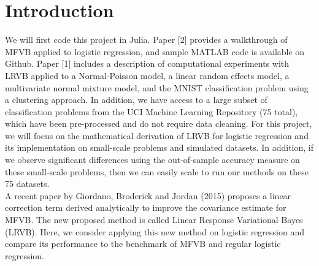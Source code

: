 
\section{Introduction}\label{sec:intro}
We will first code this project in Julia. Paper [2] provides a walkthrough of MFVB applied to logistic regression, and sample MATLAB code is available on Github.  Paper [1] includes a description of computational experiments with LRVB applied to a Normal-Poisson model, a linear random effects model, a multivariate normal mixture model, and the MNIST classification problem using a clustering approach.  In addition, we have access to a large subset of classification problems from the UCI Machine Learning Repository (75 total), which have been pre-processed and do not require data cleaning.  
For this project, we will focus on the mathematical derivation of LRVB for logistic regression and its implementation on small-scale problems and simulated datasets. In addition, if we observe significant differences using the out-of-sample accuracy measure on these small-scale problems, then we can easily scale to run our methods on these 75 datasets.  \\

A recent paper by Giordano, Broderick and Jordan (2015) proposes a linear correction term derived analytically to improve the covariance estimate for MFVB.  The new proposed method is called Linear Response Variational Bayes (LRVB).  Here, we consider applying this new method on logistic regression and compare its performance to the benchmark of MFVB and regular logistic regression.
